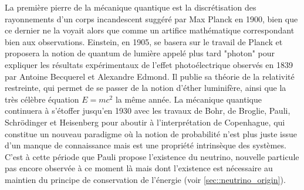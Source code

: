 		    La première pierre de la mécanique quantique est la discrétisation des rayonnements d'un corps incandescent suggéré par Max Planck en 1900\cite{Planck1900}, bien que ce dernier ne la voyait alors que comme un artifice mathématique correspondant bien aux observations. Einstein, en 1905\cite{Einstein1905-quanta}, se basera sur le travail de Planck et proposera la notion de quantum de lumière appelé plus tard "photon" pour expliquer les résultats expérimentaux de l'effet photoélectrique observés en 1839 par Antoine Becquerel et Alexandre Edmond\cite{Becquerel1839}. Il publie sa théorie de la relativité restreinte\cite{Einstein1905-relat}, qui permet de se passer de la notion d'éther luminifère, ainsi que la très célèbre équation $E=mc^2$\cite{Einstein1905-emc2} la même année. La mécanique quantique continuera à s'étoffer jusqu'en 1930 avec les travaux de Bohr, de Broglie, Pauli, Schrödinger et Heisenberg pour aboutir à l'interprétation de Copenhague\cite{Heisenberg1949}, qui constitue un nouveau paradigme où la notion de probabilité n'est plus juste issue d'un manque de connaissance mais est une propriété intrinsèque des systèmes. C'est à cette période que Pauli propose l'existence du neutrino\cite{Pauli1930}, nouvelle particule pas encore observée à ce moment là mais dont l'existence est nécessaire au maintien du principe de conservation de l'énergie (voir \autoref{sec::neutrino_origin}).
